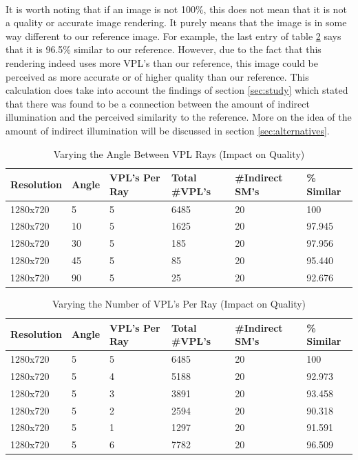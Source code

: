 \paragraph{}
It is worth noting that if an image is not 100\%, this does not mean that it is not a quality or accurate image rendering.  It purely means that the image is in some way different to our reference image.  For example, the last entry of table \ref{table:5.6} says that it is 96.5\% similar to our reference.  However, due to the fact that this rendering indeed uses more VPL's than our reference, this image could be perceived as more accurate or of higher quality than our reference.  This calculation does take into account the findings of section \ref{sec:study} which stated that there was found to be a connection between the amount of indirect illumination and the perceived similarity to the reference.  More on the idea of the amount of indirect illumination will be discussed in section \ref{sec:alternatives}.
\begin{table}[h!]
	\caption{Varying the Angle Between VPL Rays (Impact on Quality)}
	\begin{center}
	    \begin{tabular}{ | l | l | l | l | l | l |}
	    \hline
	    Resolution & Angle & VPL's Per Ray & Total \#VPL's & \#Indirect SM's & \% Similar\\ \hline
	    1280x720 & 5 & 5 & 6485 & 20 & 100\\ \hline
	    1280x720 & 10 & 5 & 1625 & 20 & 97.945\\ \hline
	    1280x720 & 30 & 5 & 185 & 20 & 97.956\\ \hline
	    1280x720 & 45 & 5 & 85 & 20 & 95.440\\ \hline
	    1280x720 & 90 & 5 & 25 & 20 & 92.676\\ \hline
	    \end{tabular}
	\end{center}
	\label{table:5.5}
\end{table}
\begin{table}[h!]
	\caption{Varying the Number of VPL's Per Ray (Impact on Quality)}
	\begin{center}
	    \begin{tabular}{ | l | l | l | l | l | l |}
	    \hline
	    Resolution & Angle & VPL's Per Ray & Total \#VPL's & \#Indirect SM's & \% Similar\\ \hline
	    1280x720 & 5 & 5 & 6485 & 20 & 100\\ \hline
	    1280x720 & 5 & 4 & 5188 & 20 & 92.973\\ \hline
	    1280x720 & 5 & 3 & 3891 & 20 & 93.458\\ \hline
	    1280x720 & 5 & 2 & 2594 & 20 & 90.318\\ \hline
	    1280x720 & 5 & 1 & 1297 & 20 & 91.591\\ \hline
	    1280x720 & 5 & 6 & 7782 & 20 & 96.509\\ \hline
	    \end{tabular}
	\end{center}
	\label{table:5.6}
\end{table}
